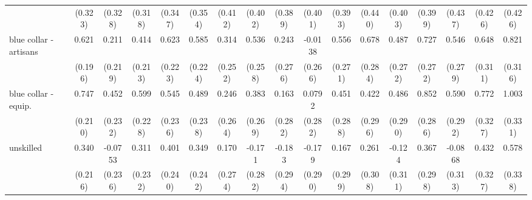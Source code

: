 {\begin{tabular}{l*{16}{c}}
                    &     (0.323)         &     (0.328)         &     (0.318)         &     (0.347)         &     (0.354)         &     (0.412)         &     (0.402)         &     (0.389)         &     (0.401)         &     (0.393)         &     (0.440)         &     (0.403)         &     (0.399)         &     (0.437)         &     (0.426)         &     (0.426)         \\
[1em]
blue collar - artisans&       0.621\sym{**} &       0.211         &       0.414         &       0.623\sym{**} &       0.585\sym{**} &       0.314         &       0.536\sym{*}  &       0.243         &     -0.0138         &       0.556\sym{*}  &       0.678\sym{*}  &       0.487         &       0.727\sym{**} &       0.546         &       0.648\sym{*}  &       0.821\sym{**} \\
                    &     (0.196)         &     (0.219)         &     (0.213)         &     (0.223)         &     (0.224)         &     (0.252)         &     (0.258)         &     (0.276)         &     (0.266)         &     (0.271)         &     (0.284)         &     (0.272)         &     (0.272)         &     (0.279)         &     (0.311)         &     (0.316)         \\
[1em]
blue collar - equip.&       0.747\sym{***}&       0.452         &       0.599\sym{**} &       0.545\sym{*}  &       0.489\sym{*}  &       0.246         &       0.383         &       0.163         &      0.0792         &       0.451         &       0.422         &       0.486         &       0.852\sym{**} &       0.590\sym{*}  &       0.772\sym{*}  &       1.003\sym{**} \\
                    &     (0.210)         &     (0.232)         &     (0.228)         &     (0.236)         &     (0.238)         &     (0.264)         &     (0.269)         &     (0.282)         &     (0.282)         &     (0.288)         &     (0.296)         &     (0.290)         &     (0.286)         &     (0.292)         &     (0.327)         &     (0.331)         \\
[1em]
unskilled           &       0.340         &     -0.0753         &       0.311         &       0.401         &       0.349         &       0.170         &      -0.171         &      -0.183         &      -0.179         &       0.167         &       0.261         &      -0.124         &       0.367         &     -0.0868         &       0.432         &       0.578         \\
                    &     (0.216)         &     (0.236)         &     (0.232)         &     (0.240)         &     (0.242)         &     (0.274)         &     (0.282)         &     (0.294)         &     (0.290)         &     (0.299)         &     (0.308)         &     (0.311)         &     (0.298)         &     (0.313)         &     (0.327)         &     (0.338)         \\

\end{tabular}}
